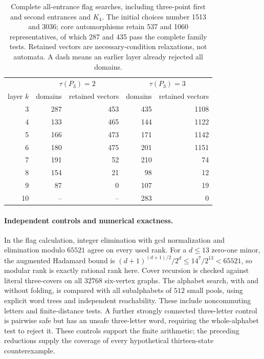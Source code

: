\documentclass[10pt]{article}
\begin{document}
\begin{table}[ht]
\centering\small
\begin{tabular}{r|rr|rr}
&\multicolumn{2}{c|}{$\tau(P_3)=2$}&\multicolumn{2}{c}{$\tau(P_3)=3$}\\
layer $k$&domains&retained vectors&domains&retained vectors\\\hline
3&287&453&435&1108\\
4&133&465&144&1122\\
5&166&473&171&1142\\
6&180&475&201&1151\\
7&191&52&210&74\\
8&154&21&98&12\\
9&87&0&107&19\\
10&--&--&283&0\\
\end{tabular}
\caption{Complete all-entrance flag searches, including three-point first and
second entrances and $K_4$. The initial choices number 1513 and 3036;
core automorphisms retain 537 and 1060 representatives, of which 287 and
435 pass the complete family tests. Retained vectors are necessary-condition
relaxations, not automata. A dash means an earlier layer already rejected
all domains.}\label{tab:eleven-results}
\end{table}

\paragraph{Independent controls and numerical exactness.}
In the flag calculation, integer elimination with gcd normalization and elimination modulo $65521$
agree on every used rank. For a $d\le13$ zero-one minor, the augmented
Hadamard bound is $(d+1)^{(d+1)/2}/2^d\le14^7/2^{13}<65521$, so modular
rank is exactly rational rank here. Cover recursion is checked against
literal three-covers on all $32768$ six-vertex graphs. The alphabet search,
with and without folding, is compared with all subalphabets of $512$ small
pools, using explicit word trees and independent reachability. These
include noncommuting letters and finite-distance tests. A further strongly
connected three-letter control is pairwise safe but has an unsafe
three-letter word, requiring the whole-alphabet test to reject it.
These controls support the finite arithmetic; the preceding reductions
supply the coverage of every hypothetical thirteen-state counterexample.
\end{document}
